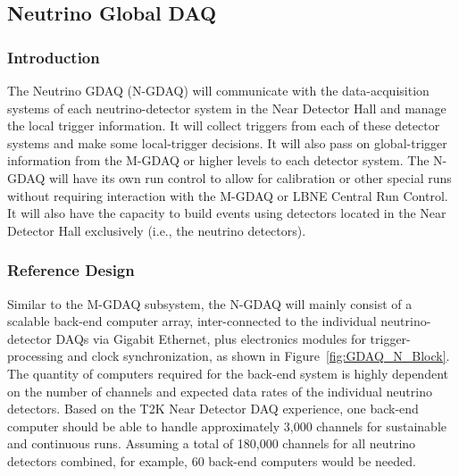 \subsection{Neutrino Global DAQ}
\label{subsec:N-GDAQ}

\subsubsection{Introduction} %

The Neutrino GDAQ (N-GDAQ) will communicate with the data-acquisition 
systems of each neutrino-detector system in the Near Detector Hall %
and manage the local trigger information. %
It will 
collect triggers from each of these detector systems and make some local-trigger 
decisions. It will also pass on global-trigger information from the %
M-GDAQ  %
or higher levels to each detector system. The N-GDAQ will have its 
own run control to allow for calibration or other special runs without 
requiring interaction with the %
M-GDAQ  %
or LBNE Central Run Control. It 
will also have the capacity to build events using detectors %
located in the Near Detector Hall exclusively (i.e., the neutrino detectors).

\subsubsection{Reference Design}

Similar to the M-GDAQ subsystem, the N-GDAQ will 
mainly consist of a scalable back-end computer array, inter-connected to 
the individual neutrino-detector DAQs via Gigabit Ethernet, plus electronics 
modules for trigger-processing and clock synchronization, as shown in Figure~\ref{fig:GDAQ_N_Block}. The %
quantity of 
computers required for the back-end system is highly dependent on the 
number of channels and expected data rates of the individual %
neutrino detectors. Based on the T2K Near Detector DAQ experience, one back-end computer 
should be able to handle approximately 3,000 channels for sustainable and 
continuous runs. Assuming a total of 180,000 channels for all %
neutrino detectors combined, for example, 60 back-end computers  would be needed.


